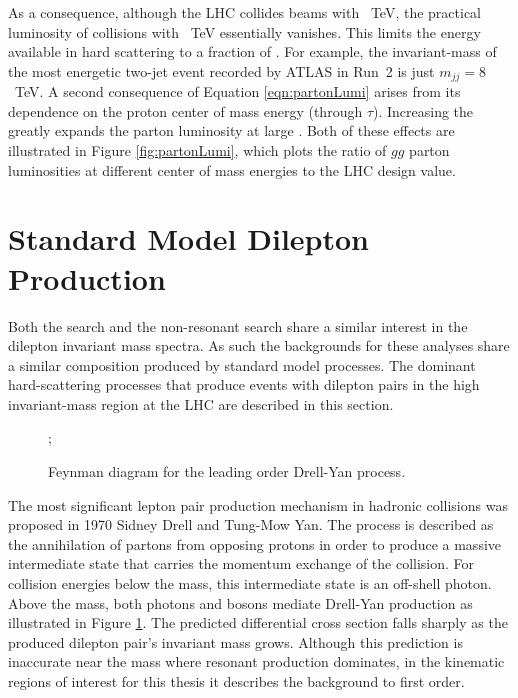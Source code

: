 As a consequence, although the LHC collides beams with ~TeV, the practical luminosity of collisions with ~TeV essentially vanishes.
This limits the energy available in hard scattering to a fraction of \sqrts.
For example, the invariant-mass of the most energetic two-jet event recorded by ATLAS in Run~2 is just $m_{jj}=8$~TeV.
A second consequence of Equation \ref{eqn:partonLumi} arises from its dependence on the proton center of mass energy \sqrts (through $\tau$).
Increasing the \sqrts greatly expands the parton luminosity at large \sqrths.
Both of these effects are illustrated in Figure \ref{fig:partonLumi}, which plots the ratio of $gg$ parton luminosities at different center of mass energies to the LHC design value.

\section{Standard Model Dilepton Production}\label{sec:phenoBkg}

Both the \hmm search and the non-resonant search share a similar interest in the dilepton invariant mass spectra.
As such the backgrounds for these analyses share a similar composition produced by standard model processes.
The dominant hard-scattering processes that produce events with dilepton pairs in the high invariant-mass region at the LHC are described in this section.

\begin{figure}[h!]
\captionsetup[subfigure]{position=b}
\centering
    ; \\ [1em]
\caption{Feynman diagram for the leading order Drell-Yan process.}
\label{fig:phenoDy}
\end{figure}

The most significant lepton pair production mechanism in hadronic collisions was proposed in 1970 Sidney Drell and Tung-Mow Yan. 
The process is described as the annihilation of partons from opposing protons in order to produce a massive intermediate state that carries the momentum exchange of the collision. \cite{drellYan}
For collision energies below the \Z mass, this intermediate state is an off-shell photon.
Above the \Z mass, both photons and \Z bosons mediate Drell-Yan production as illustrated in Figure \ref{fig:phenoDy}.
The predicted differential cross section falls sharply as the produced dilepton pair's invariant mass grows.
Although this prediction is inaccurate near the \Z mass where resonant production dominates, in the kinematic regions of interest for this thesis it describes the background to first order.

